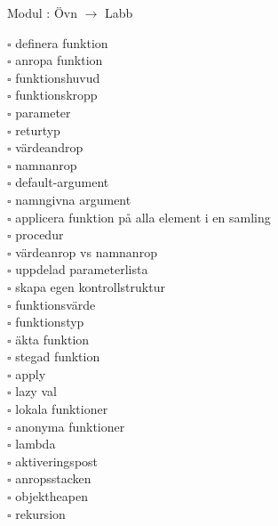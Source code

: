 
    Modul : Övn  $\rightarrow$ Labb 
    \begin{multicols}{3}\SlideFontTiny
    $\square$ definera funktion \\
$\square$ anropa funktion \\
$\square$ funktionshuvud \\
$\square$ funktionskropp \\
$\square$ parameter \\
$\square$ returtyp \\
$\square$ värdeandrop \\
$\square$ namnanrop \\
$\square$ default-argument \\
$\square$ namngivna argument \\
$\square$ applicera funktion på alla element i en samling \\
$\square$ procedur \\
$\square$ värdeanrop vs namnanrop \\
$\square$ uppdelad parameterlista \\
$\square$ skapa egen kontrollstruktur \\
$\square$ funktionsvärde \\
$\square$ funktionstyp \\
$\square$ äkta funktion \\
$\square$ stegad funktion \\
$\square$ apply \\
$\square$ lazy val \\
$\square$ lokala funktioner \\
$\square$ anonyma funktioner \\
$\square$ lambda \\
$\square$ aktiveringspost \\
$\square$ anropsstacken \\
$\square$ objektheapen \\
$\square$ rekursion \\
    \end{multicols}
    